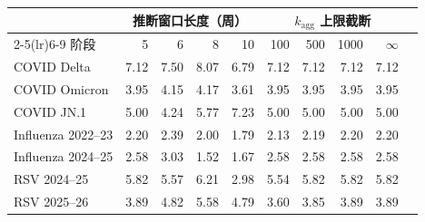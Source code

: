 \begin{tabular}{lrrrrrrrrr}
\toprule
& \multicolumn{4}{c}{推断窗口长度（周）} & \multicolumn{4}{c}{$k_{\text{agg}}$ 上限截断} \\
\cmidrule(lr){2-5}\cmidrule(lr){6-9}
阶段 & 5 & 6 & 8 & 10 & 100 & 500 & 1000 & $\infty$ \\
\midrule
COVID Delta        & 7.12 & 7.50 & 8.07 & 6.79 & 7.12 & 7.12 & 7.12 & 7.12 \\
COVID Omicron      & 3.95 & 4.15 & 4.17 & 3.61 & 3.95 & 3.95 & 3.95 & 3.95 \\
COVID JN.1         & 5.00 & 4.24 & 5.77 & 7.23 & 5.00 & 5.00 & 5.00 & 5.00 \\
Influenza 2022--23 & 2.20 & 2.39 & 2.00 & 1.79 & 2.13 & 2.19 & 2.20 & 2.20 \\
Influenza 2024--25 & 2.58 & 3.03 & 1.52 & 1.67 & 2.58 & 2.58 & 2.58 & 2.58 \\
RSV 2024--25       & 5.82 & 5.57 & 6.21 & 2.98 & 5.54 & 5.82 & 5.82 & 5.82 \\
RSV 2025--26       & 3.89 & 4.82 & 5.58 & 4.79 & 3.60 & 3.85 & 3.89 & 3.89 \\
\bottomrule
\end{tabular}
